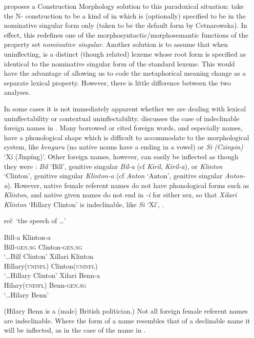 \documentclass[output=paper,colorlinks,citecolor=brown]{langscibook}
\begin{document}
\citet{cetnarowska2023} proposes a Construction Morphology \citep{booij2010} solution to this paradoxical situation: take the N- construction to be a kind of  in which  is (optionally) specified to be in the nominative  singular form only (taken to be the default form by Cetnarowska). %
In effect, this redefines one of the morphosyntactic/morphosemantic functions of the property set \textit{nominative singular}.	Another solution is  to assume that when uninflecting,  is a distinct (though related) lexeme whose root form is specified as identical to the nominative singular form of the standard lexeme. This would have the advantage of allowing us to code the metaphorical meaning change as a separate lexical property. However, there is little difference between the two analyses.

In some cases it is not immediately apparent whether we are dealing with lexical uninflectability or contextual uninflectability. \citet{spencer2020}  discusses the case of  indeclinable  foreign  names in . Many borrowed or cited foreign words, and especially names, have a phonological shape which is difficult to accommodate to the  morphological system, like \textit{kenguru} (no native nouns have a  ending in a vowel) or  \textit{Si (Czin\pr pin)} `Xí (Jìnpíng)’. Other foreign names, however, can easily be inflected as though they were : \textit{Bil} ‘Bill’, genitive singular \textit{Bil-a} (cf \textit{Kiril}, \textit{Kiril-a}), or \textit{Klinton} ‘Clinton’, genitive singular \textit{Klinton-a} (cf \textit{Anton} `Anton', genitive singular \mbox{\textit{Anton-a}).} However, native female referent names do not have  phonological forms such as \textit{Klinton}, and native given names do not end in \textit{-i} for either sex, so that \textit{Xilari Klinton} ‘Hillary Clinton’ is indeclinable, like  \textit{Si} ‘Xí’, .

\ea\label{Klinton}

re\v{c}\pr\ `the speech of \ldots'

\begin{xlist}
	\ex
	\gll		Bill-a 				Klinton-a \\
	Bill-\textsc{gen.sg} 	Clinton-\textsc{gen.sg}\\
	\glt		`\ldots Bill Clinton'
	\ex	
	\gll		Xillari 			Klinton\\
	Hillary(\textsc{uninfl}) Clinton(\textsc{uninfl})\\
	\glt		`\ldots Hillary  Clinton'
	\ex	
	\gll		Xilari 			Benn-a	\\
	Hilary(\textsc{uninfl}) Benn-\textsc{gen.sg}\\
	\glt		`\ldots Hilary  Benn' 
	
\end{xlist}	
\z
\noindent%
(Hilary Benn is a (male) British politician.) Not all foreign female referent names are indeclinable. Where the form of a name resembles that of a declinable  name it will be inflected, as in the case of the  name in . 
\end{document}
